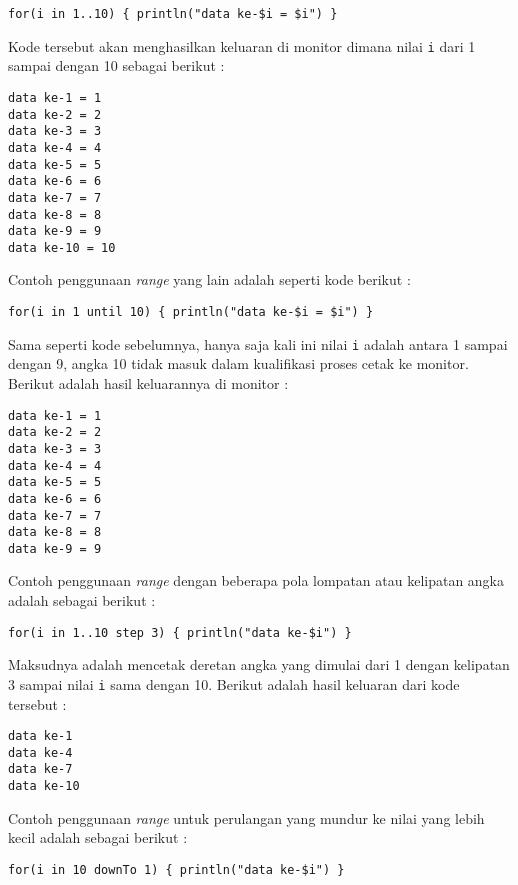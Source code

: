 \begin{lstlisting}
for(i in 1..10) { println("data ke-$i = $i") }
\end{lstlisting}

Kode tersebut akan menghasilkan keluaran di monitor dimana nilai \texttt{i} dari 1 sampai dengan 10 sebagai berikut :

\begin{lstlisting}
data ke-1 = 1
data ke-2 = 2
data ke-3 = 3
data ke-4 = 4
data ke-5 = 5
data ke-6 = 6
data ke-7 = 7
data ke-8 = 8
data ke-9 = 9
data ke-10 = 10
\end{lstlisting}

Contoh penggunaan \textit{range} yang lain adalah seperti kode berikut :

\begin{lstlisting}
for(i in 1 until 10) { println("data ke-$i = $i") }
\end{lstlisting}

Sama seperti kode sebelumnya, hanya saja kali ini nilai \texttt{i} adalah antara 1 sampai dengan 9, angka 10 tidak masuk dalam kualifikasi proses cetak ke monitor. Berikut adalah hasil keluarannya di monitor :

\begin{lstlisting}
data ke-1 = 1
data ke-2 = 2
data ke-3 = 3
data ke-4 = 4
data ke-5 = 5
data ke-6 = 6
data ke-7 = 7
data ke-8 = 8
data ke-9 = 9
\end{lstlisting}

Contoh penggunaan \textit{range} dengan beberapa pola lompatan atau kelipatan angka adalah sebagai berikut :

\begin{lstlisting}
for(i in 1..10 step 3) { println("data ke-$i") }
\end{lstlisting}

Maksudnya adalah mencetak deretan angka yang dimulai dari 1 dengan kelipatan 3 sampai nilai \texttt{i} sama dengan 10. Berikut adalah hasil keluaran dari kode tersebut :

\begin{lstlisting}
data ke-1
data ke-4
data ke-7
data ke-10
\end{lstlisting}

Contoh penggunaan \textit{range} untuk perulangan yang mundur ke nilai yang lebih kecil adalah sebagai berikut :

\begin{lstlisting}
for(i in 10 downTo 1) { println("data ke-$i") }
\end{lstlisting}


